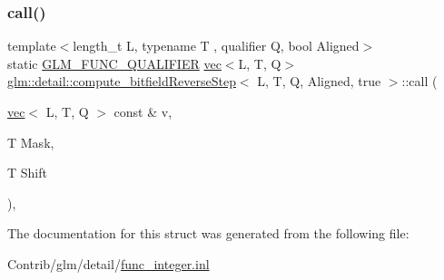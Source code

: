 \subsubsection{\texorpdfstring{call()}{call()}}
{\footnotesize\ttfamily template$<$length\+\_\+t L, typename T , qualifier Q, bool Aligned$>$ \\
static \mbox{\hyperlink{setup_8hpp_a33fdea6f91c5f834105f7415e2a64407}{G\+L\+M\+\_\+\+F\+U\+N\+C\+\_\+\+Q\+U\+A\+L\+I\+F\+I\+ER}} \mbox{\hyperlink{structglm_1_1vec}{vec}}$<$L, T, Q$>$ \mbox{\hyperlink{structglm_1_1detail_1_1compute__bitfield_reverse_step}{glm\+::detail\+::compute\+\_\+bitfield\+Reverse\+Step}}$<$ L, T, Q, Aligned, true $>$\+::call (\begin{DoxyParamCaption}\item[{\mbox{\hyperlink{structglm_1_1vec}{vec}}$<$ L, T, Q $>$ const \&}]{v,  }\item[{T}]{Mask,  }\item[{T}]{Shift }\end{DoxyParamCaption})\hspace{0.3cm}{\ttfamily [inline]}, {\ttfamily [static]}}



The documentation for this struct was generated from the following file\+:\begin{DoxyCompactItemize}
\item 
Contrib/glm/detail/\mbox{\hyperlink{func__integer_8inl}{func\+\_\+integer.\+inl}}\end{DoxyCompactItemize}
